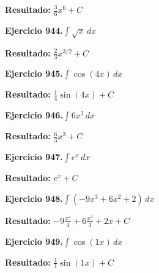 \documentclass[10pt,a4paper]{article}
\begin{document}
\begin{solbox}
\textbf{Resultado:} \(\displaystyle \frac{3}{6}x^{6} + C\)
\end{solbox}

\begin{ejbox}
\textbf{Ejercicio 944.}\quad $\int \sqrt{x}\,dx$
\end{ejbox}

\begin{solbox}
\textbf{Resultado:} \(\displaystyle \frac{2}{3}x^{3/2} + C\)
\end{solbox}

\begin{ejbox}
\textbf{Ejercicio 945.}\quad $\int \cos(4x)\,dx$
\end{ejbox}

\begin{solbox}
\textbf{Resultado:} \(\displaystyle \frac{1}{4}\sin(4x) + C\)
\end{solbox}

\newpage
\begin{ejbox}
\textbf{Ejercicio 946.}\quad $\int 6x^{2}\,dx$
\end{ejbox}

\begin{solbox}
\textbf{Resultado:} \(\displaystyle \frac{6}{3}x^{3} + C\)
\end{solbox}

\begin{ejbox}
\textbf{Ejercicio 947.}\quad $\int e^x\,dx$
\end{ejbox}

\begin{solbox}
\textbf{Resultado:} \(\displaystyle e^x + C\)
\end{solbox}

\begin{ejbox}
\textbf{Ejercicio 948.}\quad $\int (-9x^3 +6x^2 +2)\,dx$
\end{ejbox}

\begin{solbox}
\textbf{Resultado:} \(\displaystyle -9\frac{x^4}{4} +6\frac{x^3}{3} +2x + C\)
\end{solbox}

\newpage
\begin{ejbox}
\textbf{Ejercicio 949.}\quad $\int \cos(1x)\,dx$
\end{ejbox}

\begin{solbox}
\textbf{Resultado:} \(\displaystyle \frac{1}{1}\sin(1x) + C\)
\end{solbox}
\end{document}
